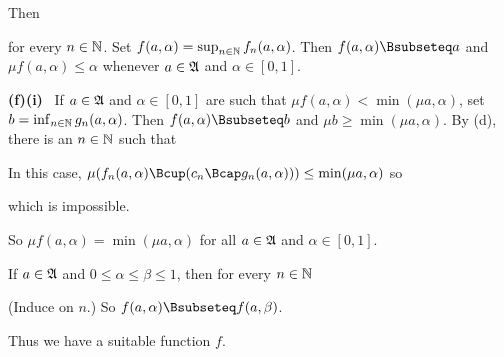 {\noindent Then



\noindent for every $n\in\Bbb N$.   Set
$f(a,\alpha)=\sup_{n\in\Bbb N}f_n(a,\alpha)$.   Then
$f(a,\alpha)\Bsubseteq a$ and $\mu f(a,\alpha)\le\alpha$ whenever
$a\in\frak A$ and $\alpha\in[0,1]$.

\medskip

{\bf (f)(i)} \Quer\ If $a\in\frak A$ and $\alpha\in[0,1]$ are such that
$\mu f(a,\alpha)<\min(\mu a,\alpha)$, set
$b=\inf_{n\in\Bbb N}g_n(a,\alpha)$.   Then $f(a,\alpha)\Bsubseteq b$ and
$\mu b\ge\min(\mu a,\alpha)$.   By (d), there is an $n\in\Bbb N$ such that


\noindent In this case,
$\mu(f_n(a,\alpha)\Bcup(c_n\Bcap g_n(a,\alpha)))\le\min(\mu a,\alpha)$
so


\noindent which is impossible.\ \Bang

So $\mu f(a,\alpha)=\min(\mu a,\alpha)$ for all $a\in\frak A$ and
$\alpha\in[0,1]$.

\medskip

 If $a\in\frak A$ and $0\le\alpha\le\beta\le 1$, then for
every $n\in\Bbb N$


\noindent(Induce on $n$.)   So $f(a,\alpha)\Bsubseteq f(a,\beta)$.

Thus we have a suitable function $f$.
}%


